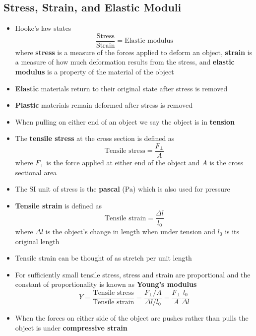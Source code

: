 \documentclass{article}
\begin{document}
\setcounter{subsection}{3}
\subsection{Stress, Strain, and Elastic Moduli}

\begin{itemize}
  \item Hooke's law states \[\frac{\textrm{Stress}}{\textrm{Strain}}=\textrm{Elastic modulus}\] where \textbf{stress} is a measure of the forces applied to deform an object, \textbf{strain} is a measure of how much deformation results from the stress, and \textbf{elastic modulus} is a property of the material of the object

  \item \textbf{Elastic} materials return to their original state after stress is removed

  \item \textbf{Plastic} materials remain deformed after stress is removed

  \item When pulling on either end of an object we say the object is in \textbf{tension}

  \item The \textbf{tensile stress} at the cross section is defined as \[\textrm{Tensile stress}=\frac{F_\perp}{A}\] where $F_\perp$ is the force applied at either end of the object and $A$ is the cross sectional area

  \item The SI unit of stress is the \textbf{pascal} (Pa) which is also used for pressure

  \item \textbf{Tensile strain} is defined as \[\textrm{Tensile strain} = \frac{\Delta l}{l_0}\] where $\Delta l$ is the object's change in length when under tension and $l_0$ is its original length

  \item Tensile strain can be thought of as stretch per unit length

  \item For sufficiently small tensile stress, stress and strain are proportional and the constant of proportionality is known as \textbf{Young's modulus} \[Y = \frac{\textrm{Tensile stress}}{\textrm{Tensile strain}} = \frac{F_\perp / A}{\Delta l / l_0} = \frac{F_\perp}{A} \frac{l_0}{\Delta l}\]

  \item When the forces on either side of the object are pushes rather than pulls the object is under \textbf{compressive strain}


\end{itemize}
\end{document}
